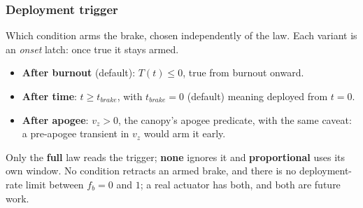 \subsubsection{Deployment trigger}\label{sec:airbrake_trigger}
Which condition arms the brake, chosen independently of the law. Each variant is an \emph{onset}
latch: once true it stays armed.
\begin{itemize}
    \item \textbf{After burnout} (default): $T(t)\leq0$, true from burnout onward.
    \item \textbf{After time}: $t\geq t_{brake}$, with $t_{brake}=0$ (default) meaning deployed from
    $t=0$.
    \item \textbf{After apogee}: $v_z>0$, the canopy's apogee predicate, with the same caveat: a
    pre-apogee transient in $v_z$ would arm it early.
\end{itemize}
Only the \textbf{full} law reads the trigger; \textbf{none} ignores it and \textbf{proportional}
uses its own window. No condition retracts an armed brake, and there is no deployment-rate limit
between $f_b=0$ and $1$; a real actuator has both, and both are future work.

